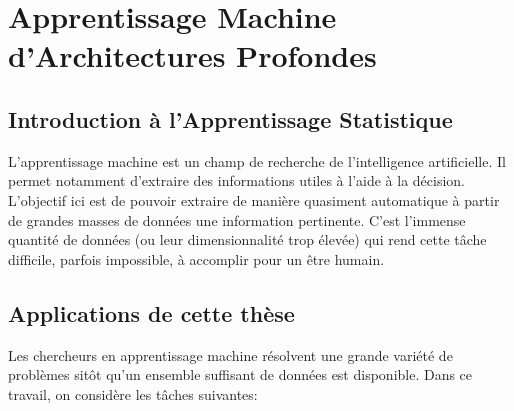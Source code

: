 \chapter{Apprentissage Machine d'Architectures Profondes}


\section{Introduction à l'Apprentissage Statistique}

L'apprentissage machine est un champ de recherche de l'intelligence
artificielle. Il permet notamment d'extraire des informations utiles à l'aide à
la décision.  L'objectif ici est de pouvoir extraire de manière quasiment
automatique à partir de grandes masses de données une information pertinente.
C'est l'immense quantité de données (ou leur dimensionnalité trop élevée)  qui
rend cette tâche difficile, parfois impossible, à accomplir pour un être
humain.

\section{Applications de cette thèse}

Les chercheurs en apprentissage machine résolvent une grande variété de
problèmes sitôt qu'un ensemble suffisant de données est disponible. Dans ce
travail, on considère les tâches suivantes:
\\

